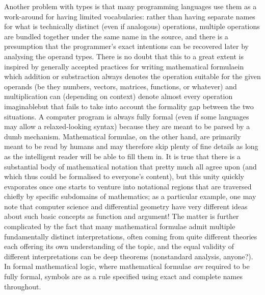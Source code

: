 \documentclass{mtmtcl}
\theoremstyle{plain}
\theoremstyle{remark}
\begin{document}

Another problem with types is that many programming languages use 
them as a work-around for having limited vocabularies: rather than 
having separate names for what is technically distinct (even if 
analogous) operations, multiple operations are bundled together under 
the same name in the source, and there is a presumption that the 
programmer's exact intentions can be recovered later by analysing the 
operand types. There is no doubt that this to a great extent is 
inspired by generally accepted practices for writing mathematical 
formulae\Ldash in which addition or substraction always denotes the 
operation suitable for the given operands (be they numbers, vectors, 
matrices, functions, or whatever) and multiplication can (depending 
on context) denote almost every operation imaginable\Rdash but that 
fails to take into account the formality gap between the two 
situations. A computer program is always fully formal (even if some 
languages may allow a relaxed-looking syntax) because they are meant 
to be parsed by a dumb mechanism. Mathematical formulae, on the other 
hand, are primarily meant to be read by humans and may therefore skip 
plenty of fine details as long as the intelligent reader will be able 
to fill them in. It is true that there is a substantial body of 
mathematical notation that pretty much all agree upon (and 
which thus could be formalised to everyone's content), but this unity 
quickly evaporates once one starts to venture into notational regions 
that are traversed chiefly by specific subdomains of mathematics; as 
a particular example, one may note that computer science and 
differential geometry have very different ideas about such basic 
concepts as function and argument! The matter is further complicated 
by the fact that many mathematical formulae admit multiple 
fundamentally distinct interpretations, often coming from quite 
different theories each offering its own understanding of the topic, 
and the equal validity of different interpretations can be deep 
theorems (nonstandard analysis, anyone?). In formal mathematical 
logic, where mathematical formulae \emph{are} required to be fully 
formal, symbols are as a rule specified using exact and complete names 
throughout.
\end{document}
